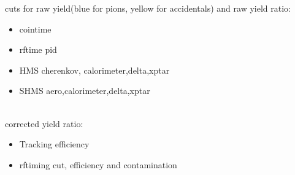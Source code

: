 \documentclass[aspectratio=169,xcolor=dvipsnames]{beamer}
\begin{document}
\begin{frame}{}
cuts for raw yield(blue for pions, yellow for accidentals) and raw yield ratio: 
    \begin{itemize}
        \item cointime
        \item rftime pid
        \item HMS cherenkov, calorimeter,delta,xptar
        \item SHMS aero,calorimeter,delta,xptar
    \end{itemize}
\\
corrected yield ratio:
\begin{itemize}
    \item Tracking efficiency
    \item rftiming cut, efficiency and contamination
\end{itemize}
\end{frame}

\end{document}
